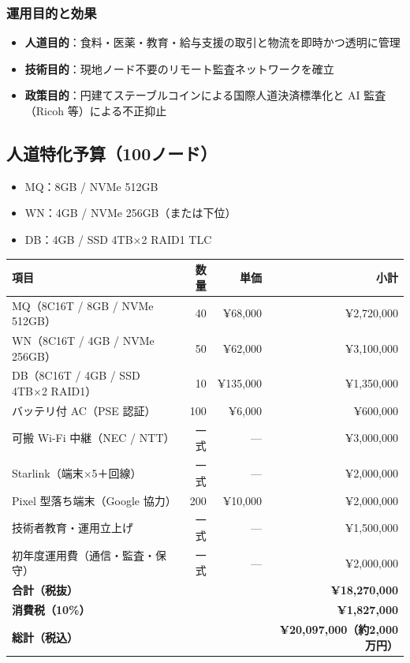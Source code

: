 \documentclass[
]{article}
\providecommand{\tightlist}{%
  \setlength{\itemsep}{0pt}\setlength{\parskip}{0pt}}
\begin{document}
\subsubsection{運用目的と効果}\label{ux904bux7528ux76eeux7684ux3068ux52b9ux679c}

\begin{itemize}
\tightlist
\item
  \textbf{人道目的}：食料・医薬・教育・給与支援の取引と物流を即時かつ透明に管理\\
\item
  \textbf{技術目的}：現地ノード不要のリモート監査ネットワークを確立\\
\item
  \textbf{政策目的}：円建てステーブルコインによる国際人道決済標準化と AI
  監査（Ricoh 等）による不正抑止
\end{itemize}

\subsection{人道特化予算（100ノード）}\label{ux4ebaux9053ux7279ux5316ux4e88ux7b97100ux30ceux30fcux30c9}

\begin{itemize}
\tightlist
\item
  MQ：8GB / NVMe 512GB\\
\item
  WN：4GB / NVMe 256GB（または下位）\\
\item
  DB：4GB / SSD 4TB×2 RAID1 TLC
\end{itemize}

\begin{longtable}[]{@{}lrrr@{}}
\toprule\noalign{}
項目 & 数量 & 単価 & 小計 \\
\midrule\noalign{}
\endhead
\bottomrule\noalign{}
\endlastfoot
MQ（8C16T / 8GB / NVMe 512GB） & 40 & ¥68,000 & ¥2,720,000 \\
WN（8C16T / 4GB / NVMe 256GB） & 50 & ¥62,000 & ¥3,100,000 \\
DB（8C16T / 4GB / SSD 4TB×2 RAID1） & 10 & ¥135,000 & ¥1,350,000 \\
バッテリ付 AC（PSE 認証） & 100 & ¥6,000 & ¥600,000 \\
可搬 Wi-Fi 中継（NEC / NTT） & 一式 & --- & ¥3,000,000 \\
Starlink（端末×5＋回線） & 一式 & --- & ¥2,000,000 \\
Pixel 型落ち端末（Google 協力） & 200 & ¥10,000 & ¥2,000,000 \\
技術者教育・運用立上げ & 一式 & --- & ¥1,500,000 \\
初年度運用費（通信・監査・保守） & 一式 & --- & ¥2,000,000 \\
\textbf{合計（税抜）} & & & \textbf{¥18,270,000} \\
\textbf{消費税（10\%）} & & & \textbf{¥1,827,000} \\
\textbf{総計（税込）} & & & \textbf{¥20,097,000（約2,000万円）} \\
\end{longtable}
\end{document}
